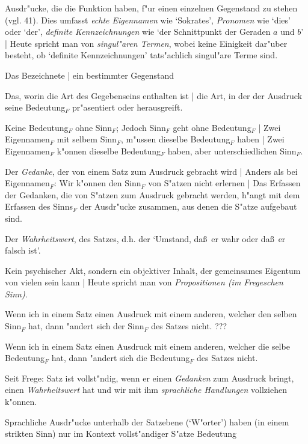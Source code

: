 \documentclass[]{scrartcl}
\begin{document}
\begin{description}[leftmargin=!,labelwidth=\widthof{\bfseries 2}]
  \item[Eigenname$_{F}$] Ausdr"ucke, die die Funktion haben, f"ur einen einzelnen Gegenstand zu stehen (vgl. 41). Dies umfasst \emph{echte Eigennamen} wie `Sokrates', \emph{Pronomen} wie `dies' oder `der', \emph{definite Kennzeichnungen} wie `der Schnittpunkt der Geraden $a$ und $b$' | Heute spricht man von \emph{singul"aren Termen}, wobei keine Einigkeit dar"uber besteht, ob `definite Kennzeichnungen' tats"achlich singul"are Terme sind.
  \item[Bedeutung$_{F}$ eines Eigennamen$_{F}$] Das Bezeichnete | ein bestimmter Gegenstand
  \item[Sinn$_{F}$ eines Eigennamen$_{F}$] Das, worin die Art des Gegebenseins enthalten ist | die Art, in der der Ausdruck seine Bedeutung$_{F}$ pr"asentiert oder herausgreift.
  \item[Beziehung Sinn$_{F}$ - Bedeutung$_{F}$] Keine Bedeutung$_{F}$ ohne Sinn$_{F}$; Jedoch Sinn$_{F}$ geht ohne Bedeutung$_{F}$ | Zwei Eigennamen$_{F}$ mit selbem Sinn$_{F}$, m"ussen dieselbe Bedeutung$_{F}$ haben | Zwei Eigennamen$_{F}$ k"onnen dieselbe Bedeutung$_{F}$ haben, aber unterschiedlichen Sinn$_{F}$.
  \item[Sinn$_{F}$ eines Satzes] Der \emph{Gedanke}, der von einem Satz zum Ausdruck gebracht wird | Anders als bei Eigennamen$_{F}$: Wir k"onnen den Sinn$_{F}$ von S"atzen nicht erlernen | Das Erfassen der Gedanken, die von S"atzen zum Ausdruck gebracht werden, h"angt mit dem Erfassen des Sinns$_{F}$ der Ausdr"ucke zusammen, aus denen die S"atze aufgebaut sind.
  \item[Bedeutung$_{F}$ eines Satzes] Der \emph{Wahrheitswert},  des Satzes, d.h. der `Umstand, da\ss~er wahr oder da\ss~er falsch ist'.
  \item[Gedanke] Kein psychischer Akt, sondern ein objektiver Inhalt, der gemeinsames Eigentum von vielen sein kann | Heute spricht man von \emph{Propositionen (im Fregeschen Sinn)}. 
  \item[Kompositionalit"at des Sinns$_{F}$] Wenn ich in einem Satz einen Ausdruck mit einem anderen, welcher den selben Sinn$_{F}$ hat, dann "andert sich der Sinn$_{F}$ des Satzes nicht. {\color{red}???}
  \item[Kompositionalit"at der Bedeutung$_{F}$] Wenn ich in einem Satz einen Ausdruck mit einem anderen, welcher die selbe Bedeutung$_{F}$ hat, dann "andert sich die Bedeutung$_{F}$ des Satzes nicht.
  \item[Satz] Seit Frege: Satz ist vollst"ndig, wenn er einen \emph{Gedanken} zum Ausdruck bringt, einen \emph{Wahrheitswert} hat und wir mit ihm \emph{sprachliche Handlungen} vollziehen k"onnen.
  \item[Kontextprinzip] Sprachliche Ausdr"ucke unterhalb der Satzebene (`W"orter') haben (in einem strikten Sinn) nur im Kontext vollst"andiger S"atze Bedeutung
\end{description}
\end{document}
